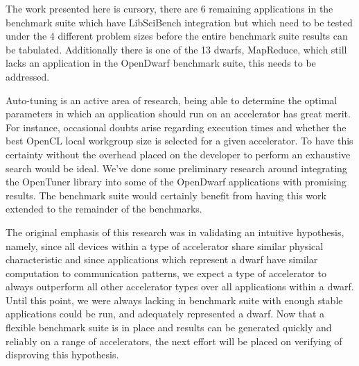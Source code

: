 \documentclass[../document.tex]{subfiles}
\begin{document}
\label{sec:future_work}

The work presented here is cursory, there are 6 remaining applications in the benchmark suite which have LibSciBench integration but which need to be tested under the 4 different problem sizes before the entire benchmark suite results can be tabulated.
Additionally there is one of the 13 dwarfs, MapReduce, which still lacks an application in the OpenDwarf benchmark suite, this needs to be addressed.

Auto-tuning is an active area of research, being able to determine the optimal parameters in which an application should run on an accelerator has great merit.
For instance, occasional doubts arise regarding execution times and whether the best OpenCL local workgroup size is selected for a given accelerator.
To have this certainty without the overhead placed on the developer to perform an exhaustive search would be ideal.
We've done some preliminary research around integrating the OpenTuner library into some of the OpenDwarf applications with promising results.
The benchmark suite would certainly benefit from having this work extended to the remainder of the benchmarks.

The original emphasis of this research was in validating an intuitive hypothesis, namely, since all devices within a type of accelerator share similar physical characteristic and since applications which represent a dwarf have similar computation to communication patterns, we expect a type of accelerator to always outperform all other accelerator types over all applications within a dwarf.
Until this point, we were always lacking in benchmark suite with enough stable applications could be run, and adequately represented a dwarf.
Now that a flexible benchmark suite is in place and results can be generated quickly and reliably on a range of accelerators, the next effort will be placed on verifying of disproving this hypothesis.
\end{document}
